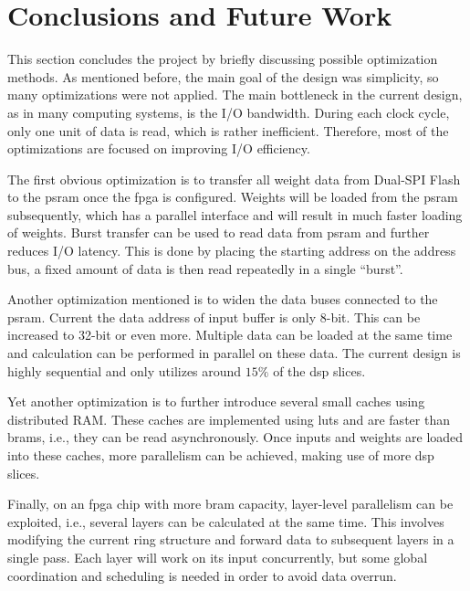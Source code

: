 
\chapter{Conclusions and Future Work}

This section concludes the project by briefly discussing possible optimization methods.
As mentioned before, the main goal of the design was simplicity, so many optimizations were not applied.
The main bottleneck in the current design, as in many computing systems, is the I/O bandwidth. During
each clock cycle, only one unit of data is read, which is rather inefficient. Therefore, most of the
optimizations are focused on improving I/O efficiency.

The first obvious optimization is to transfer all weight data from Dual-SPI Flash to the \gls{psram} once
the \gls{fpga} is configured. Weights will be loaded from the \gls{psram} subsequently, which has a parallel
interface and will result in much faster loading of weights.
Burst transfer can be used to read data from \gls{psram} and further reduces I/O latency. This is done by
placing the starting address on the address bus, a fixed amount of data is then read repeatedly in a single
``burst''.

Another optimization mentioned is to widen the data buses connected to the \gls{psram}. Current the
data address of input buffer is only 8-bit. This can be increased to 32-bit or even more. Multiple data
can be loaded at the same time and calculation can be performed in parallel on these data. The current
design is highly sequential and only utilizes around $15\%$ of the \gls{dsp} slices.

Yet another optimization is to further introduce several small caches using distributed RAM. These caches
are implemented using \glspl{lut} and are faster than \glspl{bram}, i.e., they can be read asynchronously.
Once inputs and weights are loaded into these caches, more parallelism can be achieved,
making use of more \gls{dsp} slices.

Finally, on an \gls{fpga} chip with more \gls{bram} capacity, layer-level parallelism can be exploited, i.e.,
several layers can be calculated at the same time. This involves modifying the current ring structure and
forward data to subsequent layers in a single pass. Each layer will work on its input concurrently, but
some global coordination and scheduling is needed in order to avoid data overrun.

\clearpage %
